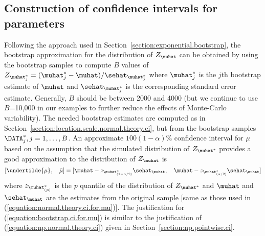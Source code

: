 \subsection{Construction of confidence 
intervals for parameters} 
\label{section:bootstrap.ci.for.loc.scale.parameters}
Following the approach used in
Section~\ref{section:exponential.bootstrap}, the bootstrap
approximation for the
distribution of $Z_{\muhat}$ can be obtained by using the bootstrap
samples to compute $B$ values
of $Z_{\muhat^{*}_{j}}=(\muhat^{*}_{j} - \muhat)/\sehat_{\muhat^{*}_{j}}$
where $\muhat^{*}_{j}$ is the $j$th bootstrap estimate of $\muhat$ and
$\sehat_{\muhat^{*}_{j}}$ is the corresponding standard error estimate.
Generally, $B$ should be between 2000 and 4000 (but we continue to
use $B$=10,000 in our examples to further reduce the effects of
Monte-Carlo variability).  The needed bootstrap estimates are computed
as in Section~\ref{section:location.scale.normal.theory.ci}, but from
the bootstrap samples $\DATA^{*}_{j}, j=1, \ldots ,B$.  
An approximate $100(1-\alpha)\%$ confidence
interval for $\mu$ based on the assumption that the simulated
distribution of $Z_{\muhat^{*}}$ provides a good approximation to the
distribution of $Z_{\muhat}$ is
\begin{equation}
\label{equation:bootstrap.ci.for.mu}
 [\undertilde{\mu}, \quad \tilde{\mu}] = [\muhat -
z_{\muhat^{*}_{(1-\alpha/2)}}\sehat_{\muhat},
\quad
\muhat -  z_{\muhat^{*}_{(\alpha/2)}}\sehat_{\muhat}]
\end{equation}
where $z_{\muhat^{*}_{(p)}}$ is the $p$ quantile of the distribution
of $Z_{\muhat^{*}}$ and $\muhat$ and $\sehat_{\muhat}$ are the
estimates from the original sample [same as those used in
(\ref{equation:normal.theory.ci.for.mu})].  The justification for
(\ref{equation:bootstrap.ci.for.mu}) is similar to the justification
of (\ref{equation:np.normal.theory.ci}) given in
Section~\ref{section:np.pointwise.ci}.




